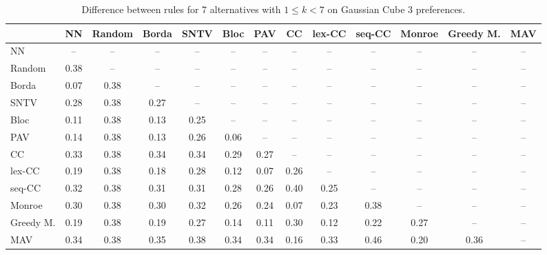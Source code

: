 
\begin{table*}[h!]
\centering
\begin{tabular}{lcccccccccccc}
\toprule
 & NN & Random & Borda & SNTV & Bloc & PAV & CC & lex-CC & seq-CC & Monroe & Greedy M. & MAV \\
\midrule
NN & -- & -- & -- & -- & -- & -- & -- & -- & -- & -- & -- & -- \\
Random & 0.38 & -- & -- & -- & -- & -- & -- & -- & -- & -- & -- & -- \\
Borda & 0.07 & 0.38 & -- & -- & -- & -- & -- & -- & -- & -- & -- & -- \\
SNTV & 0.28 & 0.38 & 0.27 & -- & -- & -- & -- & -- & -- & -- & -- & -- \\
Bloc & 0.11 & 0.38 & 0.13 & 0.25 & -- & -- & -- & -- & -- & -- & -- & -- \\
PAV & 0.14 & 0.38 & 0.13 & 0.26 & 0.06 & -- & -- & -- & -- & -- & -- & -- \\
CC & 0.33 & 0.38 & 0.34 & 0.34 & 0.29 & 0.27 & -- & -- & -- & -- & -- & -- \\
lex-CC & 0.19 & 0.38 & 0.18 & 0.28 & 0.12 & 0.07 & 0.26 & -- & -- & -- & -- & -- \\
seq-CC & 0.32 & 0.38 & 0.31 & 0.31 & 0.28 & 0.26 & 0.40 & 0.25 & -- & -- & -- & -- \\
Monroe & 0.30 & 0.38 & 0.30 & 0.32 & 0.26 & 0.24 & 0.07 & 0.23 & 0.38 & -- & -- & -- \\
Greedy M. & 0.19 & 0.38 & 0.19 & 0.27 & 0.14 & 0.11 & 0.30 & 0.12 & 0.22 & 0.27 & -- & -- \\
MAV & 0.34 & 0.38 & 0.35 & 0.38 & 0.34 & 0.34 & 0.16 & 0.33 & 0.46 & 0.20 & 0.36 & -- \\
\bottomrule
\end{tabular}

\caption{Difference between rules for 7 alternatives with $1 \leq k < 7$ on Gaussian Cube 3 preferences.}
\end{table*}
